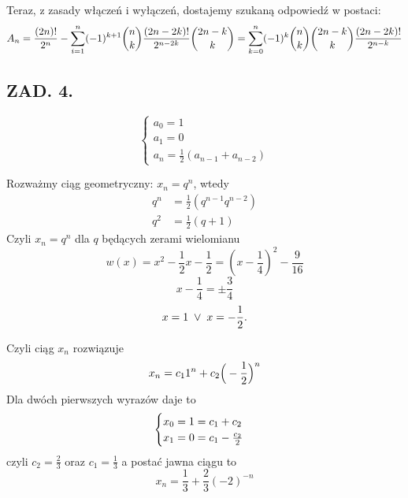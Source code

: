 \documentclass{article}[13pt]
\begin{document}
Teraz, z zasady włączeń i wyłączeń, dostajemy szukaną odpowiedź w postaci:
$$A_{n}={(2n)!\over 2^n}-\sum\limits_{i=1}^n(-1)^{k+1}{n\choose k}{(2n-2k)!\over 2^{n-2k}}{2n-k\choose k}=\sum\limits_{k=0}^n(-1)^k{n\choose k}{2n-k\choose k}{(2n-2k)!\over 2^{n-k}}$$


\subsection*{ZAD. 4.}

$$\begin{cases}
    a_0=1\\
    a_1=0\\
    a_n=\frac12(a_{n-1}+a_{n-2})
\end{cases}$$

Rozważmy ciąg geometryczny: $x_n=q^n$, wtedy
\begin{align*}
    q^n&=\frac12(q^{n-1}q^{n-2})\\
    q^2&=\frac12(q+1)
\end{align*}
Czyli $x_n=q^n$ dla $q$ będących zerami wielomianu
$$w(x)=x^2-\frac12x-\frac12=(x-\frac14)^2-\frac9{16}$$
$$x-\frac14=\pm \frac34$$
$$x=1\;\lor\;x=-{1\over 2}.$$

Czyli ciąg $x_n$ rozwiązuje
$$x_n=c_11^n+c_2\Big(-{1\over 2}\Big)^n$$
Dla dwóch pierwszych wyrazów daje to
\begin{align*}
    \begin{cases}
        x_0=1=c_1+c_2\\
        x_1=0=c_1-{c_2\over2}
    \end{cases}\\
\end{align*}
czyli $c_2=\frac23$ oraz $c_1=\frac13$ a postać jawna ciągu to
$$x_n=\frac13+\frac23(-2)^{-n}$$








\end{document}
